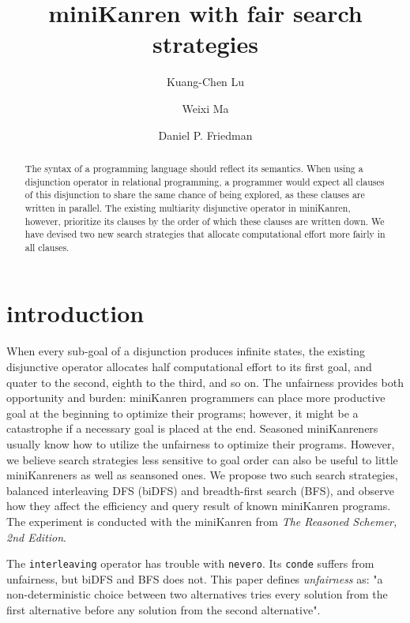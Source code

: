 \documentclass[format=acmlarge, review=true, authordraft=true]{acmart}
\title{miniKanren with fair search strategies}
\author{Kuang-Chen Lu}
\affiliation{Indiana University}
\author{Weixi Ma}
\affiliation{Indiana University}
\author{Daniel P. Friedman}
\affiliation{Indiana University}
\begin{document}
\begin{abstract}

The syntax of a programming language should reflect its semantics. When using a
disjunction operator in relational programming, a programmer would expect all
clauses of this disjunction to share the same chance of being explored, as
these clauses are written in parallel. The existing multiarity disjunctive
operator in miniKanren, however, prioritize its clauses by the order of which
these clauses are written down. We have devised two new search strategies that
allocate computational effort more fairly in all clauses.

\end{abstract}

\maketitle

\section{introduction}

When every sub-goal of a disjunction produces infinite states, the existing 
disjunctive operator allocates half computational effort to its first goal, and 
quater to the second, eighth to the third, and so on. The unfairness provides 
both opportunity and burden: miniKanren programmers can place more productive 
goal at the beginning to optimize their programs; however, it might be a 
catastrophe if a necessary goal is placed at the end. Seasoned miniKanreners 
usually know how to utilize the unfairness to optimize their programs. However, 
we believe search strategies less sensitive to goal order can also be useful to 
little miniKanreners as well as seansoned ones. We propose two such search 
strategies, balanced interleaving DFS (biDFS) and breadth-first search (BFS), 
and observe how they affect the efficiency and query result of known miniKanren 
programs. The experiment is conducted with the miniKanren from \textit{The 
Reasoned Schemer, 2nd Edition}.




The \texttt{interleaving} operator has trouble with \texttt{nevero}. Its 
\texttt{conde} suffers from unfairness, but biDFS and BFS does not. This paper 
defines \textit{unfairness} as: "a non-deterministic choice between two 
alternatives tries every solution from the first alternative before any 
solution from the second alternative".
\end{document}
